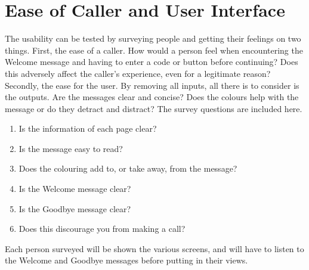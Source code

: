 \documentclass[main.tex]{subfiles}
\begin{document}
\section{Ease of Caller and User Interface}
The usability can be tested by surveying people and getting their feelings on two things. First, the ease of a caller. How would a person feel when encountering the Welcome message and having to enter a code or button before continuing? Does this adversely affect the caller's experience, even for a legitimate reason? Secondly, the ease for the user. By removing all inputs, all there is to consider is the outputs. Are the messages clear and concise? Does the colours help with the message or do they detract and distract? The survey questions are included here.

\begin{enumerate}
	\item Is the information of each page clear?
	\item Is the message easy to read?
	\item Does the colouring add to, or take away, from the message?
	\item Is the Welcome message clear?
	\item Is the Goodbye message clear?
	\item Does this discourage you from making a call?
\end{enumerate}

Each person surveyed will be shown the various screens, and will have to listen to the Welcome and Goodbye messages before putting in their views.
\end{document}
